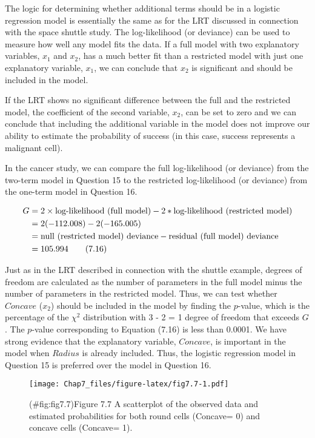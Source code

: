\documentclass[
]{report}
\begin{document}
The logic for determining whether additional terms should be in a logistic regression model is essentially the same as for the LRT discussed in connection with the space shuttle study. The log-likelihood (or deviance) can be used to measure how well any model fits the data. If a full model with two explanatory variables, \(x_1\) and \(x_2\), has a much better fit than a restricted model with just one explanatory variable, \(x_1\), we can conclude that \(x_2\) is significant and should be included in the model.

If the LRT shows no significant difference between the full and the restricted model, the coefficient of
the second variable, \(x_2\), can be set to zero and we can conclude that including the additional variable in the
model does not improve our ability to estimate the probability of success (in this case, success represents a
malignant cell).

In the cancer study, we can compare the full log-likelihood (or deviance) from the two-term model in
Question 15 to the restricted log-likelihood (or deviance) from the one-term model in Question 16.

\begin{align}
G &= 2 \times \text{log-likelihood (full model)} - 2 * \text{log-likelihood (restricted model)} \notag \\
&= 2(-112.008) - 2(-165.005) \notag \\
&= \text{null (restricted model) deviance} - \text{residual (full model) deviance} \notag \\
&= 105.994 \tag{7.16}
\end{align}

Just as in the LRT described in connection with the shuttle example, degrees of freedom are calculated as the
number of parameters in the full model minus the number of parameters in the restricted model. Thus, we can
test whether \(Concave\) (\(x_2\)) should be included in the model by finding the \(p\)-value, which is the percentage of
the \(\chi^2\) distribution with 3 - 2 = 1 degree of freedom that exceeds \(G\). The \(p\)-value corresponding to Equation
(7.16) is less than 0.0001. We have strong evidence that the explanatory variable, \(Concave\), is important in
the model when \(Radius\) is already included. Thus, the logistic regression model in Question 15 is preferred
over the model in Question 16.

\begin{figure}
\centering
\texttt{[image: Chap7\_files/figure-latex/fig7.7-1.pdf]}
\caption{(\#fig:fig7.7)Figure 7.7 A scatterplot of the observed data and estimated probabilities for both round cells (Concave= 0) and concave cells (Concave= 1).}
\end{figure}
\end{document}
